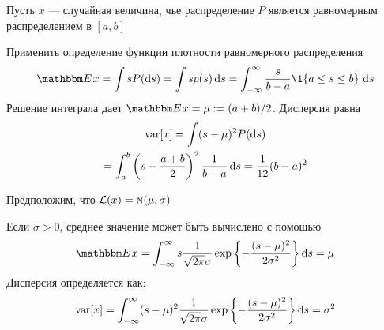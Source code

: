 \begin{frame}

    \vspace{2em}
    \Eg
    Пусть $x$ --- случайная величина, чье распределение $P$ является равномерным
    распределением в $[a, b]$
    
    \vspace{.7em}
    Применить определение функции плотности равномерного распределения
    \begin{equation*}
        \EE x 
        = \int s P(\diff s) 
        = \int s p(s) \diff s 
        = \int_{-\infty}^{\infty} 
         \frac{s}{b - a} \1\{a \leq s \leq b\} \, \diff s 
    \end{equation*}
    Решение интеграла дает $\EE x = \mu := (a + b)/2$. Дисперсия равна
    \begin{multline*}
        \operatorname{var} [x]
        = \int (s - \mu)^2 P(\mathop{}\!\mathrm{d} s)
        \\ = \int_a^b
            \left(s -\frac{a + b}{2} \right)^2
            \frac{1}{b - a} \mathop{}\!\mathrm{d} s
        = \frac{1}{12} (b-a)^2
    \end{multline*}
    
\end{frame}



\begin{frame}

    \vspace{2em}
    \Eg
    Предположим, что $\mathcal L(x) = \textrm{\sc n}(\mu, \sigma)$
    
    Если $\sigma > 0$, среднее значение может быть вычислено с помощью
    \begin{equation*}
        \EE x 
        = \int_{-\infty}^{\infty} s 
        \frac{1}{\sqrt{2 \pi} \sigma}
           \exp \left\{ - 
               \frac{(s - \mu)^2}{2\sigma^2} \right\}  \diff s
        = \mu
    \end{equation*}
    Дисперсия определяется как:
    \begin{equation*}
        \operatorname{var} [x]
        = \int_{-\infty}^{\infty}
            (s - \mu)^2
            \frac{1}{\sqrt{2 \pi} \sigma}
               \exp \left\{ - 
               \frac{(s - \mu)^2}{2\sigma^2} \right\}  \mathop{}\!\mathrm{d} s
        = \sigma^2
    \end{equation*}
    
\end{frame}

